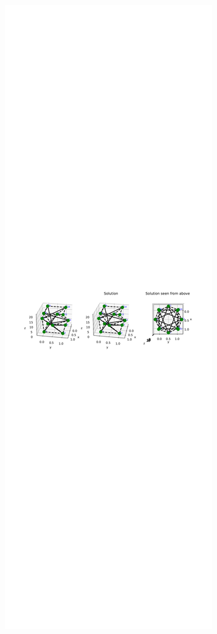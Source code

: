 \begin{figure}[!ht]
\centering
\begin{subfigure}{.72\textwidth}
  \centering
  \includegraphics[width=0.99\linewidth]{Bilder/2FREESTANDING.pdf}

\end{subfigure}
\end{figure}
